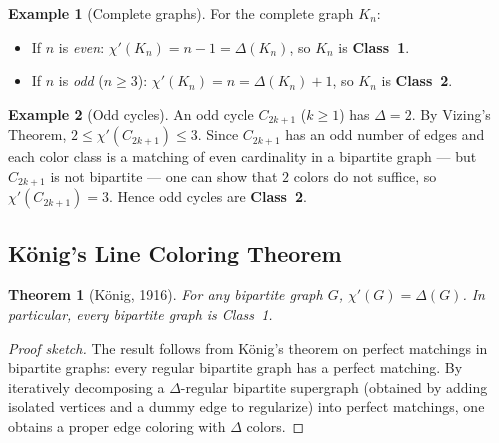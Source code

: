 \documentclass[12pt,a4paper]{article}
\theoremstyle{definition}
\newtheorem{example}{Example}[section]
\theoremstyle{plain}
\newtheorem{theorem}{Theorem}[section]
\theoremstyle{remark}
\begin{document}
\begin{example}[Complete graphs]\label{ex:Kn-edge}
  For the complete graph $K_n$:
  \begin{itemize}
    \item If $n$ is \emph{even}: $\chi'(K_n) = n - 1 = \Delta(K_n)$, so $K_n$
          is \textbf{Class~1}.
    \item If $n$ is \emph{odd} ($n \geq 3$): $\chi'(K_n) = n = \Delta(K_n)+1$,
          so $K_n$ is \textbf{Class~2}.
  \end{itemize}
\end{example}

\begin{example}[Odd cycles]\label{ex:odd-cycle-edge}
  An odd cycle $C_{2k+1}$ ($k \geq 1$) has $\Delta = 2$.  By
  Vizing's Theorem, $2 \leq \chi'(C_{2k+1}) \leq 3$.  Since $C_{2k+1}$ has an
  odd number of edges and each color class is a matching of even cardinality in a
  bipartite graph — but $C_{2k+1}$ is not bipartite — one can show that $2$
  colors do not suffice, so $\chi'(C_{2k+1}) = 3$.  Hence odd cycles are
  \textbf{Class~2}.
\end{example}

\subsection{König's Line Coloring Theorem}

\begin{theorem}[König, 1916]\label{thm:konig}
  For any bipartite graph $G$, $\chi'(G) = \Delta(G)$.  In particular, every
  bipartite graph is Class~1.
\end{theorem}

\begin{proof}[Proof sketch]
  The result follows from König's theorem on perfect matchings in bipartite
  graphs: every regular bipartite graph has a perfect matching.  By iteratively
  decomposing a $\Delta$-regular bipartite supergraph (obtained by adding
  isolated vertices and a dummy edge to regularize) into perfect matchings, one
  obtains a proper edge coloring with $\Delta$ colors.
\end{proof}
\end{document}
